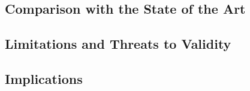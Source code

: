 \subsection{Comparison with the State of the Art}
\label{sec:discussion-sota}

\subsection{Limitations and Threats to Validity}
\label{sec:discussion-limits}

\subsection{Implications}
\label{sec:discussion-implications}

